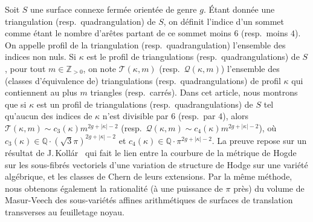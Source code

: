 \documentclass[JEP,XML,SOM,Unicode]{cedram}
\theoremstyle{plain}
\theoremstyle{definition}
\begin{document}




\begin{altabstract}
Soit $S$ une surface connexe fermée orientée de genre $g$. Étant donnée une triangulation (resp.\ quadrangulation) de $S$, on définit l'indice d'un sommet comme étant le nombre d'arêtes partant de ce sommet moins $6$ (resp.\ moins $4$). On appelle profil de la triangulation (resp.\ quadrangulation) l'ensemble des indices non nuls. Si $\kappa$ est le profil de triangulations (resp.\ quadrangulations) de $S$, pour tout $m\in \mathbb{Z}_{>0}$, on note $\mathscr{T}(\kappa,m)$ (resp.\ $\mathscr{Q}(\kappa,m)$) l'ensemble des (classes d'équivalence de) triangulations (resp.\ quadrangulations) de profil $\kappa$ qui contiennent au plus $m$ triangles (resp.\ carrés). Dans cet article, nous montrons que si $\kappa$ est un profil de triangulations (resp.\ quadrangulations) de $S$ tel qu'aucun des indices de $\kappa$ n'est divisible par $6$ (resp.\ par $4$), alors $\mathscr{T}(\kappa,m)\sim c_3(\kappa)m^{2g+|\kappa|-2}$ (resp.\ $\mathscr{Q}(\kappa,m)\sim c_4(\kappa)m^{2g+|\kappa|-2}$), o\`u $c_3(\kappa) \in \mathbb{Q}\cdot(\sqrt{3}\pi)^{2g+|\kappa|-2}$ et $c_4(\kappa)\in \mathbb{Q}\cdot\pi^{2g+|\kappa|-2}$. La preuve repose sur un résultat de J.\,Kollár~ qui fait le lien entre la courbure de la métrique de Hogde sur les sous-fibrés vectoriels d'une variation de structure de Hodge sur une variété algébrique, et les classes de Chern de leurs extensions. Par la même méthode, nous obtenons également la rationalité (à une puissance de $\pi$ près) du volume de Masur-Veech des sous-variétés affines arithmétiques de surfaces de translation transverses au feuilletage noyau.
\end{altabstract}

\maketitle
\tableofcontents
\mainmatter
\end{document}
